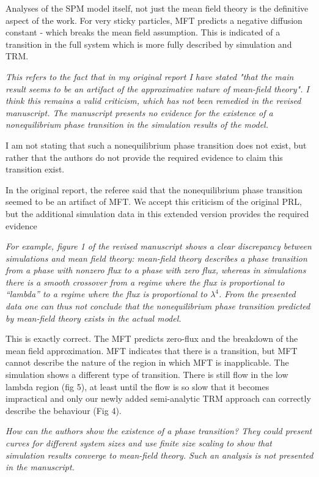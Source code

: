 \documentclass[a4paper,10pt]{article}
\begin{document}
Analyses of the SPM model itself, not just the mean field theory
is the definitive aspect of the work.  For very sticky
particles, MFT predicts a negative diffusion constant - which breaks
the mean field assumption.  This is indicated of a transition in the
full system which is more fully described by simulation and TRM.  

{\it 
This refers to the fact that in my original report I have stated "that
the main result seems to be an artifact of the approximative nature of
mean-field theory". I think this remains a valid criticism, which has
not been remedied in the revised manuscript. The manuscript presents
no evidence for the existence of a nonequilibrium phase transition in
the simulation results of the model.

I am not stating that such a nonequilibrium phase transition does not
exist, but rather that the authors do not provide the required
evidence to claim this transition exist. 
}

In the original report, the referee said that the nonequilibrium phase
transition seemed to be an artifact of MFT.  We accept this criticism
of the original PRL, but the additional simulation data in this
extended version provides the required evidence

{\it 
For example, figure 1 of the
revised manuscript shows a clear discrepancy between simulations and
mean field theory: mean-field theory describes a phase transition from
a phase with nonzero flux to a phase with zero flux, whereas in
simulations there is a smooth crossover from a regime where the flux
is proportional to “lambda” to a regime where the flux is proportional
to $\lambda^4$. From the presented data one can thus not conclude that
the nonequilibrium phase transition predicted by mean-field theory
exists in the actual model.}

This is exactly correct.  The MFT predicts zero-flux and the breakdown
of the mean field approximation. MFT indicates that there is a
transition, but MFT cannot describe the nature of the region in which
MFT is inapplicable.  The simulation shows a different type of transition. 
There is still flow in the low lambda region (fig 5),
at least until the flow is so slow that it becomes impractical and
only our newly added semi-analytic TRM approach can correctly
describe the behaviour (Fig 4).


{\it
How can the authors show the existence of a phase transition? They
could present curves for different system sizes and use finite size
scaling to show that simulation results converge to mean-field theory.
Such an analysis is not presented in the manuscript.
}
\end{document}
